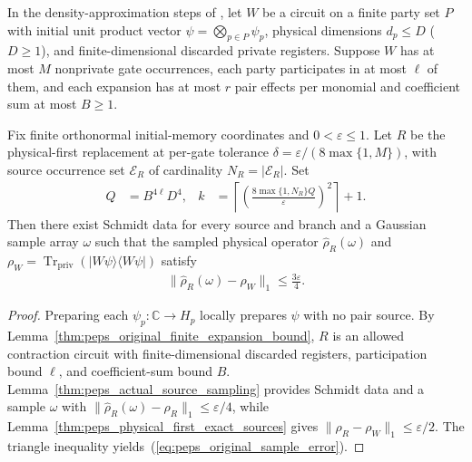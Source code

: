 \begin{lemma}
    \label{thm:peps_sampled_original_density}
    \leanok
    In the density-approximation steps of
    \cite[proof of Theorem~5.2]{OpenAI2026PolynomialPEPS},
    let $W$ be a circuit on a finite party set $P$ with initial unit product
    vector $\psi=\bigotimes_{p\in P}\psi_p$, physical dimensions $d_p\le D$
    ($D\ge 1$), and finite-dimensional discarded private registers. Suppose $W$
    has at most $M$ nonprivate gate occurrences, each party participates in at
    most $\ell$ of them, and each expansion has at most $r$ pair effects per
    monomial and coefficient sum at most $B\ge1$.

    Fix finite orthonormal initial-memory coordinates and $0<\varepsilon\le1$.
    Let $R$ be the physical-first replacement at per-gate tolerance
    $\delta=\varepsilon/(8\max\{1,M\})$, with source occurrence set
    $\mathcal E_R$ of cardinality $N_R=|\mathcal E_R|$. Set
    \begin{align}
        Q & =B^{4\ell}D^4, &
        k & =\left\lceil
        \left(\frac{8\max\{1,N_R\}Q}{\varepsilon}\right)^2
        \right\rceil+1.
        \label{eq:peps_original_sample_count}
    \end{align}
    Then there exist Schmidt data for every source and branch and a Gaussian
    sample array $\omega$ such that the sampled physical operator
    $\widehat\rho_R(\omega)$ and $\rho_W=\operatorname{Tr}_{\mathrm{priv}}(|W\psi\rangle\langle W\psi|)$
    satisfy
    \begin{align}
        \|\widehat\rho_R(\omega)-\rho_W\|_1
        \le\frac{3\varepsilon}{4}.
        \label{eq:peps_original_sample_error}
    \end{align}
\end{lemma}

\begin{proof}\leanok
    Preparing each $\psi_p:\mathbb C\to H_p$ locally prepares $\psi$ with no
    pair source. By Lemma~\ref{thm:peps_original_finite_expansion_bound}, $R$ is an allowed
    contraction circuit with finite-dimensional discarded registers, participation
    bound $\ell$, and coefficient-sum bound $B$.
    Lemma~\ref{thm:peps_actual_source_sampling} provides Schmidt data and a
    sample $\omega$ with $\|\widehat\rho_R(\omega)-\rho_R\|_1\le\varepsilon/4$,
    while Lemma~\ref{thm:peps_physical_first_exact_sources} gives
    $\|\rho_R-\rho_W\|_1\le\varepsilon/2$. The triangle inequality yields~(\ref{eq:peps_original_sample_error}).
\end{proof}


